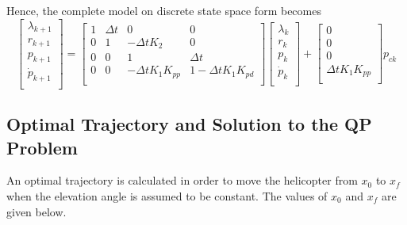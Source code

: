 \documentclass[a4paper, 12pt]{article}\usepackage[utf8]{inputenc}
\begin{document}
Hence, the complete model on discrete state space form becomes
\begin{equation} \label{eq:disc_state_space}
    \begin{bmatrix}
        {\lambda}_{k+1}\\
        {r}_{k+1}\\
        {p}_{k+1}\\
        \dot{p}_{k+1}\\
    \end{bmatrix}
     = 
    \begin{bmatrix}
    1 & \Delta{t} & 0 & 0\\
    0 & 1 & -\Delta{t}K_2 & 0\\
    0 & 0 & 1 & \Delta{t}\\
    0 & 0 & -\Delta{t}K_1K_{pp} & 1-\Delta{t}K_{1}K_{pd}\\
    \end{bmatrix}
    \begin{bmatrix}
        \lambda_k\\
        r_k\\
        p_k\\
        \dot{p}_k\\
    \end{bmatrix}
    +\begin{bmatrix}
    0\\
    0\\
    0\\
    \Delta{t} K_1K_{pp}\\
    \end{bmatrix} p_{ck}
\end{equation}   

\subsection{Optimal Trajectory and Solution to the QP Problem}\label{3.3}


An optimal trajectory is calculated in order to move the helicopter from $x_0$ to $x_f$ when the elevation angle is assumed to be constant. The values of $x_0$ and $x_f$ are given below.
\end{document}
